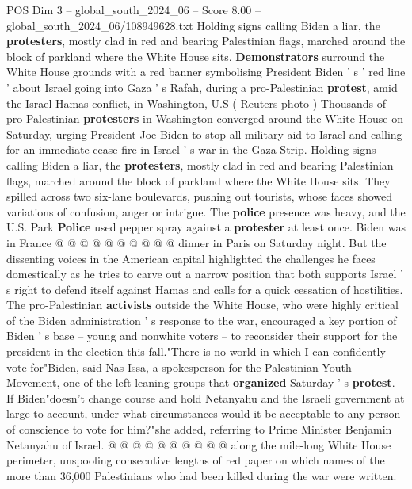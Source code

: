 \begin{textsample}{POS Dim 3 – global\_south\_2024\_06 – Score 8.00 – global\_south\_2024\_06/108949628.txt}  \label{ex:f3_pos_347}
Holding signs calling Biden a liar, the \textbf{protesters}, mostly clad in red and bearing Palestinian flags, marched around the block of parkland where the White House sits. \textbf{Demonstrators} surround the White House grounds with a red banner symbolising President Biden ' s ' red line ' about Israel going into Gaza ' s Rafah, during a pro-Palestinian \textbf{protest}, amid the Israel-Hamas conflict, in Washington, U.S ( Reuters photo ) Thousands of pro-Palestinian \textbf{protesters} in Washington converged around the White House on Saturday, urging President Joe Biden to stop all military aid to Israel and calling for an immediate cease-fire in Israel ' s war in the Gaza Strip.
Holding signs calling Biden a liar, the \textbf{protesters}, mostly clad in red and bearing Palestinian flags, marched around the block of parkland where the White House sits.
They spilled across two six-lane boulevards, pushing out tourists, whose faces showed variations of confusion, anger or intrigue.
The \textbf{police} presence was heavy, and the U.S.
Park \textbf{Police} used pepper spray against a \textbf{protester} at least once.
Biden was in France @ @ @ @ @ @ @ @ @ @ dinner in Paris on Saturday night.
But the dissenting voices in the American capital highlighted the challenges he faces domestically as he tries to carve out a narrow position that both supports Israel ' s right to defend itself against Hamas and calls for a quick cessation of hostilities.
The pro-Palestinian \textbf{activists} outside the White House, who were highly critical of the Biden administration ' s response to the war, encouraged a key portion of Biden ' s base -- young and nonwhite voters -- to reconsider their support for the president in the election this fall."There is no world in which I can confidently vote for"Biden, said Nas Issa, a spokesperson for the Palestinian Youth Movement, one of the left-leaning groups that \textbf{organized} Saturday ' s \textbf{protest}.
If Biden"doesn't change course and hold Netanyahu and the Israeli government at large to account, under what circumstances would it be acceptable to any person of conscience to vote for him?"she added, referring to Prime Minister Benjamin Netanyahu of Israel. @ @ @ @ @ @ @ @ @ @ along the mile-long White House perimeter, unspooling consecutive lengths of red paper on which names of the more than 36,000 Palestinians who had been killed during the war were written.

\end{textsample}
